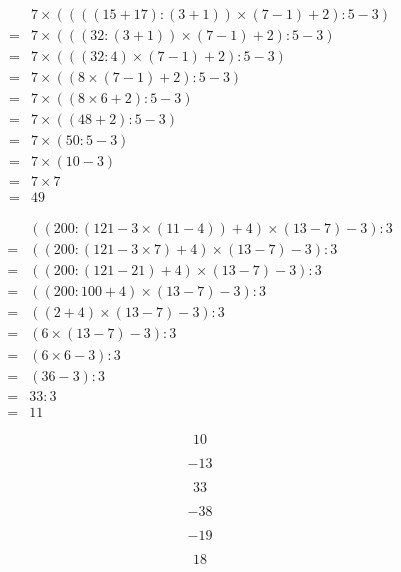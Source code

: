 \separe

\begin{multicols}{2}
  \begin{align*}
    &7\times ((((15+17):(3+1))\times (7-1)+2):5-3)\\
    =&7\times (((32:(3+1))\times (7-1)+2):5-3)\\
    =&7\times (((32:4)\times (7-1)+2):5-3)\\
    =&7\times ((8\times (7-1)+2):5-3)\\
    =&7\times ((8\times 6+2):5-3)\\
    =&7\times ((48+2):5-3)\\
    =&7\times (50:5-3)\\
    =&7\times (10-3)\\
    =&7\times 7\\
    =&49
  \end{align*}

  \begin{align*}
    &((200:(121-3\times (11-4))+4)\times (13-7)-3):3\\
    =&((200:(121-3\times 7)+4)\times (13-7)-3):3\\
    =&((200:(121-21)+4)\times (13-7)-3):3\\
    =&((200:100+4)\times (13-7)-3):3\\
    =&((2+4)\times (13-7)-3):3\\
    =&(6\times (13-7)-3):3\\
    =&(6\times 6-3):3\\
    =&(36-3):3\\
    =&33:3\\
    =&11
  \end{align*}
\end{multicols}

\begin{multicols}{3}
    $$10$$
      
    $$-13$$
      
    $$33$$
     
\end{multicols}

\begin{multicols}{3}
    $$-38$$
      
    $$-19$$
      
    $$18$$
\end{multicols}


